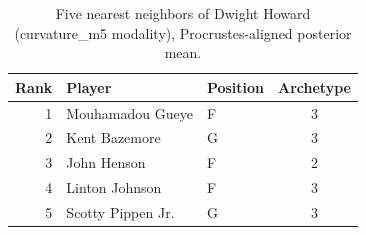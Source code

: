 \begin{table}[htbp]
  \centering\small
  \begin{tabular}{rllc}
    \toprule
    Rank & Player & Position & Archetype \\
    \midrule
    1 & Mouhamadou Gueye & F & 3 \\
    2 & Kent Bazemore & G & 3 \\
    3 & John Henson & F & 2 \\
    4 & Linton Johnson & F & 3 \\
    5 & Scotty Pippen Jr. & G & 3 \\
    \bottomrule
  \end{tabular}
  \caption{Five nearest neighbors of Dwight Howard (curvature_m5 modality), Procrustes-aligned posterior mean.}
  \label{tab:Dwight_Howard_neighbors_curvature_m5}
\end{table}

